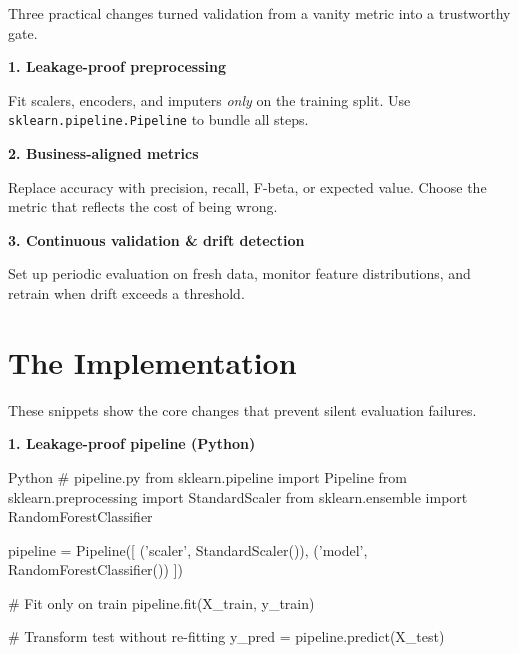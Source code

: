 \documentclass[11pt]{article}
\begin{document}
Three practical changes turned validation from a vanity metric into a trustworthy gate.

\vspace{0.15in}

\begin{darkbox}
\textbf{1. Leakage-proof preprocessing}

Fit scalers, encoders, and imputers \textit{only} on the training split. Use \texttt{sklearn.pipeline.Pipeline} to bundle all steps.
\end{darkbox}

\vspace{0.15in}

\begin{darkbox}
\textbf{2. Business-aligned metrics}

Replace accuracy with precision, recall, F-beta, or expected value. Choose the metric that reflects the cost of being wrong.
\end{darkbox}

\vspace{0.15in}

\begin{darkbox}
\textbf{3. Continuous validation \& drift detection}

Set up periodic evaluation on fresh data, monitor feature distributions, and retrain when drift exceeds a threshold.
\end{darkbox}

\vfill
\newpage


\section*{The Implementation}

\vspace{0.1in}

These snippets show the core changes that prevent silent evaluation failures.

\vspace{0.15in}

\textbf{1. Leakage-proof pipeline (Python)}

\begin{codebox}{Python}
# pipeline.py
from sklearn.pipeline import Pipeline
from sklearn.preprocessing import StandardScaler
from sklearn.ensemble import RandomForestClassifier

pipeline = Pipeline([
    ('scaler', StandardScaler()),
    ('model', RandomForestClassifier())
])

# Fit only on train
pipeline.fit(X_train, y_train)

# Transform test without re-fitting
y_pred = pipeline.predict(X_test)
\end{codebox}
\end{document}
